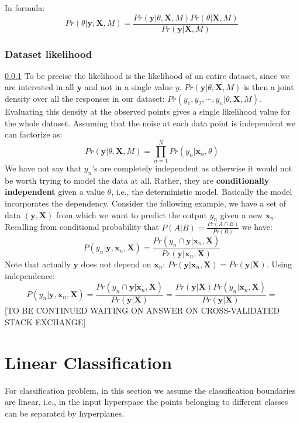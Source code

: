 \documentclass[12pt, letterpaper]{article}
\theoremstyle{definition}
\newcommand{\X}{\mathrm{\mathbf{X}}}
\newcommand{\y}{\mathbf{y}}
\newcommand{\x}{\mathbf{x}}
\begin{document}
In formula:
\begin{equation}
\label{ClassBayes}
Pr(\theta|\y,\X,M) = \frac{Pr(\y|\theta,\X,M)Pr(\theta|\X, M)}{Pr(\y|\X,M)}
\end{equation}

\subsubsection{Dataset likelihood}
\label{dataset likelihood}
\ref{dataset likelihood}
To be precise the likelihood is the likelihood of an entire dataset, since we are interested in all $\y$ and not in a single value $y$. $Pr(\y|\theta,\X,M)$ is then a joint density over all the responses in our dataset: $Pr(y_1, y_2, \cdots, y_n|\theta,\X,M)$. Evaluating this density at the observed points gives a single likelihood value for the whole dataset.	 Assuming that the noise at each data point is independent we can factorize as:
\begin{equation}
Pr(\y|\theta,\X,M) = \prod_{n=1}^N Pr(y_n|\x_n, \theta)
\end{equation}
We have not say that $y_n$'s are completely independent as otherwise it would not be worth trying to model the data at all. Rather, they are \textbf{conditionally independent} given a value $\theta$, i.e., the deterministic model.
Basically the model incorporates the dependency. Consider the following example, we have a set of data $(\y,\X)$ from which we want to predict the output $y_n$ given a new $\x_n$. Recalling from conditional probability that $P(A|B) = \frac{Pr(A\cap B)}{Pr(B)}$ we have:
\begin{equation}
P(y_n|\y,\x_n, \X) = \frac{Pr(y_n\cap \y|\x_n,\X)}{Pr(\y|\x_n,\X)}
\end{equation}
Note that actually $\y$ does not depend on $\x_n$: $Pr(\y|\x_n,\X) = Pr(\y|\X)$. Using independence:
\begin{equation}
P(y_n|\y,\x_n, \X) = \frac{Pr(y_n\cap \y|\x_n,\X)}{Pr(\y|\X)} = \frac{Pr(\y|\X) Pr(y_n|\x_n,\X)}{Pr(\y|\X)} = 
\end{equation}
[TO BE CONTINUED WAITING ON ANSWER ON CROSS-VALIDATED STACK EXCHANGE]

\section{Linear Classification}
For classification problem, in this section we assume the classification boundaries are linear, i.e., in the input hyperspace the points belonging to different classes can be separated by hyperplanes. 
\end{document}
